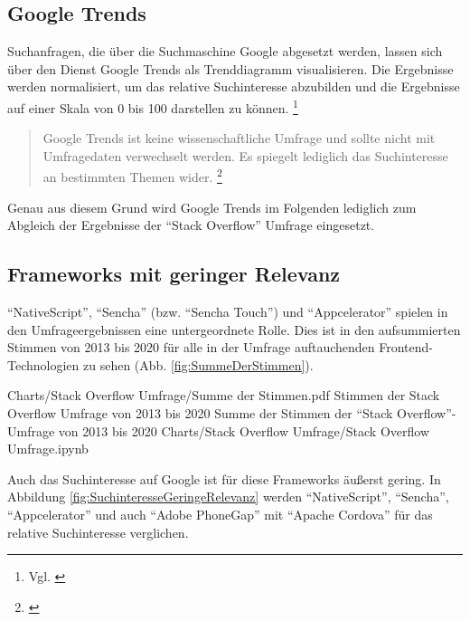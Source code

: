 \subsection{Google Trends} Suchanfragen, die über die Suchmaschine Google abgesetzt werden, lassen sich  über den Dienst Google Trends  als Trenddiagramm visualisieren.
Die Ergebnisse werden normalisiert, um das relative Suchinteresse abzubilden und die Ergebnisse auf einer Skala von 0 bis 100 darstellen zu können.
\footnote{Vgl. \cite{GoogleTrendsHilfe}}

\begin{quotation}
Google Trends ist keine wissenschaftliche Umfrage und sollte nicht mit Umfragedaten verwechselt werden.
Es spiegelt lediglich das Suchinteresse an bestimmten Themen wider.
\footnote{\cite{GoogleTrendsHilfe}}
\end{quotation}

Genau aus diesem Grund wird Google Trends im Folgenden lediglich zum Abgleich der Ergebnisse der \enquote{Stack Overflow} Umfrage eingesetzt.

\subsection{Frameworks mit geringer Relevanz}

\enquote{NativeScript}, \enquote{Sencha} (bzw.
\enquote{Sencha Touch}) und \enquote{Appcelerator} spielen in den Umfrageergebnissen eine untergeordnete Rolle.
Dies ist in den aufsummierten Stimmen von 2013 bis 2020 für alle in der Umfrage auftauchenden Frontend-Technologien zu sehen (Abb.
\ref{fig:SummeDerStimmen}).

\begin{alexfigurewithnotebook}{Charts/Stack Overflow Umfrage/Summe der Stimmen.pdf}
	{Stimmen der Stack Overflow Umfrage von 2013 bis 2020}
	{Summe der Stimmen der \enquote{Stack Overflow}-Umfrage von 2013 bis 2020}
	{Charts/Stack Overflow Umfrage/Stack Overflow Umfrage.ipynb}
	{}

	\label{lst:Schritt1MassnahmenDeserialisierenOhneFehlerUnitTest}

\end{alexfigurewithnotebook}

Auch das Suchinteresse auf Google ist für diese Frameworks äußerst gering.
In Abbildung \ref{fig:SuchinteresseGeringeRelevanz} werden \enquote{NativeScript}, \enquote{Sencha}, \enquote{Appcelerator} und auch \enquote{Adobe PhoneGap} mit \enquote{Apache Cordova} für das relative Suchinteresse verglichen.

